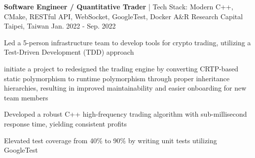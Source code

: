 \begin{cventries}
  \vspace{12pt}

  \cventry
    {\textbf{Software Engineer / Quantitative Trader} | \color{awesome} Tech Stack: Modern C++, CMake, RESTful API, WebSocket, GoogleTest, Docker} %
    {A\&R Research Capital} %
    {Taipei, Taiwan} %
    {Jan. 2022 - Sep. 2022} %
    {
      \begin{cvitems} %
        \item Led a 5-person infrastructure team to develop tools for crypto trading, utilizing a Test-Driven Development (TDD) approach
        \item initiate a project to redesigned the trading engine by converting CRTP-based static polymorphism to runtime polymorphism through proper inheritance hierarchies, resulting in improved maintainability and easier onboarding for new team members
        \item Developed a robust C++ high-frequency trading algorithm with sub-millisecond response time, yielding consistent profits 
        \item Elevated test coverage from 40\% to 90\% by writing unit tests utilizing GoogleTest
      \end{cvitems}
    }

  \vspace{12pt}

\end{cventries}
